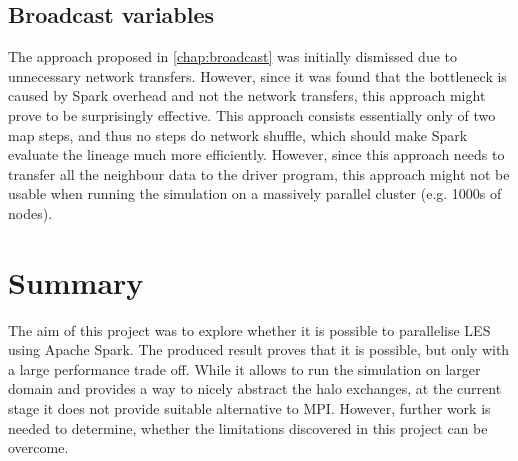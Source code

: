 \documentclass{l4proj}
\begin{document}
\subsection{Broadcast variables}
The approach proposed in \autoref{chap:broadcast} was initially dismissed due to 
unnecessary network transfers. However, since it was found that the bottleneck 
is caused by Spark overhead and not the network transfers, this approach
might prove to be surprisingly effective. This approach consists essentially only 
of two map steps, and thus no steps do network shuffle, which should make Spark
evaluate the lineage much more efficiently. However, since this approach needs
to transfer all the neighbour data to the driver program, this approach might
not be usable when running the simulation on a massively parallel cluster (e.g. 1000s of nodes).

\section{Summary}

The aim of this project was to explore whether it is possible to parallelise 
LES using Apache Spark. The produced result proves that it is possible, but only 
with a large performance trade off. While it allows to run the simulation on larger
domain and provides a way to nicely abstract the halo exchanges, at the current stage
it does not provide suitable alternative to MPI. However, further work is needed
to determine, whether the limitations discovered in this project can be overcome.
\end{document}
